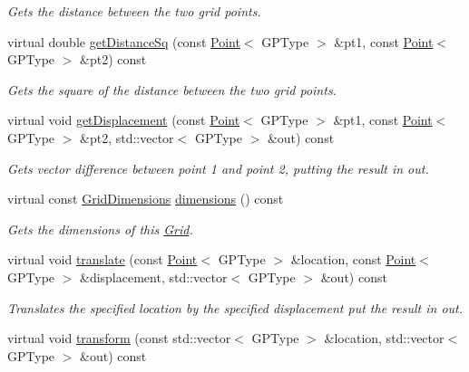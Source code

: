 \begin{DoxyCompactItemize}
\begin{DoxyCompactList}\small\item\em Gets the distance between the two grid points. \end{DoxyCompactList}\item 
virtual double \hyperlink{classrepast_1_1_base_grid_a8075dd20e6d559d453a530943ab9d387}{get\-Distance\-Sq} (const \hyperlink{classrepast_1_1_point}{Point}$<$ G\-P\-Type $>$ \&pt1, const \hyperlink{classrepast_1_1_point}{Point}$<$ G\-P\-Type $>$ \&pt2) const 
\begin{DoxyCompactList}\small\item\em Gets the square of the distance between the two grid points. \end{DoxyCompactList}\item 
virtual void \hyperlink{classrepast_1_1_base_grid_a8c3b8755d2fc2bf75163a0fc76ce1d4a}{get\-Displacement} (const \hyperlink{classrepast_1_1_point}{Point}$<$ G\-P\-Type $>$ \&pt1, const \hyperlink{classrepast_1_1_point}{Point}$<$ G\-P\-Type $>$ \&pt2, std\-::vector$<$ G\-P\-Type $>$ \&out) const 
\begin{DoxyCompactList}\small\item\em Gets vector difference between point 1 and point 2, putting the result in out. \end{DoxyCompactList}\item 
virtual const \hyperlink{classrepast_1_1_grid_dimensions}{Grid\-Dimensions} \hyperlink{classrepast_1_1_base_grid_a5f8a2fc16b8aeba026a58fcb374cf05c}{dimensions} () const 
\begin{DoxyCompactList}\small\item\em Gets the dimensions of this \hyperlink{classrepast_1_1_grid}{Grid}. \end{DoxyCompactList}\item 
virtual void \hyperlink{classrepast_1_1_base_grid_aa5607ff3f29ed7478f0de1d6884e0d7e}{translate} (const \hyperlink{classrepast_1_1_point}{Point}$<$ G\-P\-Type $>$ \&location, const \hyperlink{classrepast_1_1_point}{Point}$<$ G\-P\-Type $>$ \&displacement, std\-::vector$<$ G\-P\-Type $>$ \&out) const 
\begin{DoxyCompactList}\small\item\em Translates the specified location by the specified displacement put the result in out. \end{DoxyCompactList}\item 
virtual void \hyperlink{classrepast_1_1_base_grid_abe3c51f54b40e50e5e2b92b0b1b8e0de}{transform} (const std\-::vector$<$ G\-P\-Type $>$ \&location, std\-::vector$<$ G\-P\-Type $>$ \&out) const 

\end{DoxyCompactItemize}
